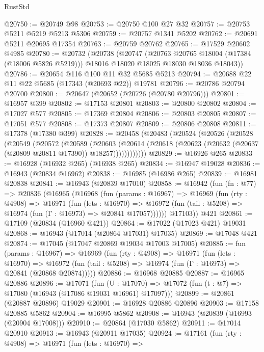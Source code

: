 \begin{lexlean}{RustStd}
\begin{coremodule}
@20750 := @20749 @98
@20753 := @20750 @100 @27 @32
@20757 := @20753 @5211 @5219 @5213 @5306
@20759 := @20757 @1341 @5202
@20762 := @20691 @5211 @20695 @17354
@20763 := @20759 @20762
@20765 := @17529 @20602 @4985
@20780 := @20732
    (@20738
      (@20747
        (@20763 @20765 @18004 (@17384 (@18006 @5826 @5219)))
        @18016
        @18020
        @18025
        @18030
        @18036
        @18043))
@20786 := @20654 @116 @100 @11 @32 @5685 @5213
@20794 := @20688 @22 @11 @22 @5685 (@17343 (@20693 @22)) @19781
@20796 := @20786 @20794 @20700
@20800 := @20647 (@20652 (@20726 (@20780 @20796)))
@20801 := @16957 @399
@20802 := @17153 @20801
@20803 := @20800 @20802
@20804 := @17027 @577
@20805 := @17369 @20804
@20806 := @20803 @20805
@20807 := @17051 @577
@20808 := @17373 @20807
@20809 := @20806 @20808
@20811 := @17378 (@17380 @399)
@20828 := @20458
    (@20483
      (@20524
        (@20526
          (@20528
            (@20549
              (@20572
                (@20589
                  (@20603
                    (@20614
                      (@20618 (@20623 (@20632 (@20637 (@20809 @20811 @17390)) @18257))))))))))))
@20829 := @16926 @265
@20833 := @16928 (@16932 @265) (@16938 @265)
@20834 := @16947 @19028
@20836 := @16943 (@20834 @16962)
@20838 := @16985 (@16986 @265)
@20839 := @16981 @20838
@20841 := @16943 (@20839 @17010)
@20858 := @16942
    (fun (fn : @77) =>
    @20836
      (@16965
        (@16968
          (fun (params : @16967) =>
          @16969
            (fun (rty : @4908) =>
            @16971
              (fun (lets : @16970) =>
              @16972 (fun (tail : @5208) => @16974 (fun (Γ : @16973) => @20841 @17057))))))
        @17103))
    @421
@20861 := @17109 (@20834 (@16960 @421))
@20864 := @17022 (@17023 @421) @19031
@20868 := @16943 (@17014 (@20864 @17031) @17035)
@20869 := @17048 @421
@20874 := @17045 (@17047 @20869 @19034 @17003 @17005)
@20885 := fun (params : @16967) =>
  @16969
    (fun (rty : @4908) =>
    @16971
      (fun (lets : @16970) =>
      @16972 (fun (tail : @5208) => @16974 (fun (Γ : @16973) => @20841 (@20868 @20874)))))
@20886 := @16968 @20885
@20887 := @16965 @20886
@20896 := @17071
    (fun (U : @17070) => @17072 (fun (t : @7) => @17080 (@16943 (@17086 @19031 @16961) @17097)))
@20899 := @20861 (@20887 @20896) @19029
@20901 := @16928 @20886 @20896
@20903 := @17158 @20885 @5862
@20904 := @16995 @5862
@20908 := @16943 (@20839 (@16993 (@20904 @17008)))
@20910 := @20864 (@17030 @5862)
@20911 := @17014 @20910
@20913 := @16943 (@20911 @17035)
@20924 := @17161
    (fun (rty : @4908) =>
    @16971
      (fun (lets : @16970) =>

\end{coremodule}
\end{lexlean}
